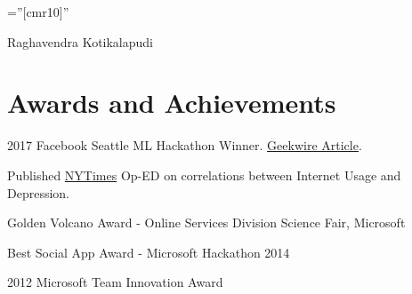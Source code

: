 \documentclass[a4paper,11pt]{article}
\makeatletter
\newcommand*{\compress}{\@minipagetrue}
\makeatother
\begin{document}
\pagestyle{empty} %
\font\fb=''[cmr10]'' %


\par{\centering
		{\Huge Raghavendra Kotikalapudi
    }\bigskip\par}

\section{Awards and Achievements}
\begin{minipage}[t]{\textwidth}
    \begin{compactitem} \compress
    	\item 2017 Facebook Seattle ML Hackathon Winner. \href{https://www.geekwire.com/2017/facebook-hackathon-engineers-combine-seattle-data-machine-learning-solve-civic-issues/}{Geekwire Article}.
        \item Published \href{http://www.nytimes.com/2012/06/17/opinion/sunday/how-depressed-people-use-the-internet.html?_r=3}{NYTimes} Op-ED on correlations between Internet Usage and Depression.
        \item Golden Volcano Award  - Online Services Division Science Fair, Microsoft
        \item Best Social App Award - Microsoft Hackathon 2014
        \item 2012 Microsoft Team Innovation Award
    \end{compactitem}
\end{minipage}
\end{document}
